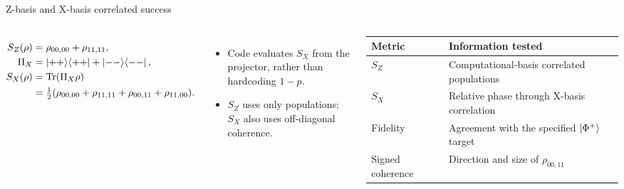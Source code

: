 \documentclass[10pt,aspectratio=169]{beamer}
\newcommand{\sourcefoot}[1]{}
\begin{document}
\begin{frame}[t]{Z-basis and X-basis correlated success}
\begin{columns}[T]
\begin{align*}
S_Z(\rho)&=\rho_{00,00}+\rho_{11,11},\\
\Pi_X&=\ket{++}\!\bra{++}+\ket{--}\!\bra{--},\\
S_X(\rho)&=\mathrm{Tr}(\Pi_X\rho)\\
&=\tfrac12(\rho_{00,00}+\rho_{11,11}+\rho_{00,11}+\rho_{11,00}).
\end{align*}
\begin{itemize}
  \item Code evaluates $S_X$ from the projector, rather than hardcoding $1-p$.
  \item $S_Z$ uses only populations; $S_X$ also uses off-diagonal coherence.
\end{itemize}
\begin{tabular}{@{}p{}p{}@{}}
\toprule
Metric & Information tested\\
\midrule
$S_Z$ & Computational-basis correlated populations\\
$S_X$ & Relative phase through X-basis correlation\\
Fidelity & Agreement with the specified $\ket{\Phi^+}$ target\\
Signed coherence & Direction and size of $\rho_{00,11}$\\
\bottomrule
\end{tabular}
\end{columns}
\sourcefoot{Projector metric: \texttt{src/phase\_error\_blind\_spot.py}; tests: \texttt{tests/test\_x\_basis\_diagnostic.py}.}
\end{frame}
\end{document}
